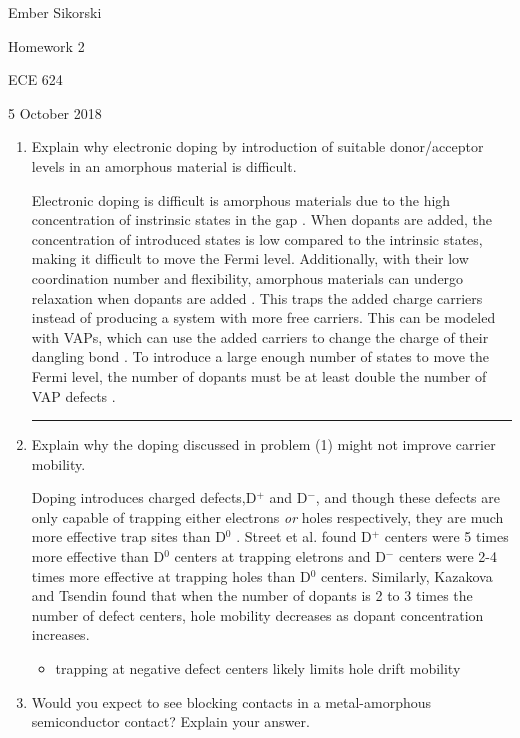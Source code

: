 \documentclass[12pt]{elsarticle}
\newcommand{\vs}{\vspace{2mm}}
\newcommand{\fullline}{\noindent\rule{14cm}{0.4pt} \vspace{4mm}}
\begin{document}
\begin{flushright}
	Ember Sikorski\par
	Homework 2\par
	ECE 624\par 
	5 October 2018
\end{flushright}


\begin{enumerate}
\item Explain why electronic doping by introduction of suitable donor/acceptor levels in an amorphous material is difficult. \par \vs
Electronic doping is difficult is amorphous materials due to the high concentration of instrinsic states in the gap \cite{Tauc1976}. When dopants are added, the concentration of introduced states is low compared to the intrinsic states, making it difficult to move the Fermi level. Additionally, with their low coordination number and flexibility, amorphous materials can undergo relaxation when dopants are added \cite{Kim2015}. This traps the added charge carriers instead of producing a system with more free carriers. This can be modeled with VAPs, which can use the added carriers to change the charge of their dangling bond \cite{Fritzsche2007}. To introduce a large enough number of states to move the Fermi level, the  number of dopants must be at least double the number of VAP defects \cite{Fritzsche2007}.

\fullline
\item Explain why the doping discussed in problem (1) might not improve carrier mobility. \par \vs
Doping introduces charged defects,D$^{+}$ and D$^{-}$, and though these defects are only capable of trapping either electrons \emph{or} holes respectively,  they are much more effective trap sites than D$^{0}$ \cite{Street1983}. Street et al. found D$^{+}$ centers were 5 times more effective than D$^{0}$ centers at trapping eletrons and D$^{-}$ centers were 2-4 times more effective at trapping holes than D$^{0}$ centers. Similarly, Kazakova and Tsendin \cite{Kazakova1999} found that when the number of dopants is 2 to 3 times the number of defect centers, hole mobility decreases as dopant concentration increases.
\begin{itemize}
	\item \cite{Kazakova1999} trapping at negative defect centers likely limits hole drift mobility
\end{itemize}
\item Would you expect to see blocking contacts in a metal-amorphous semiconductor contact? Explain your answer.


\end{enumerate}
\end{document}

